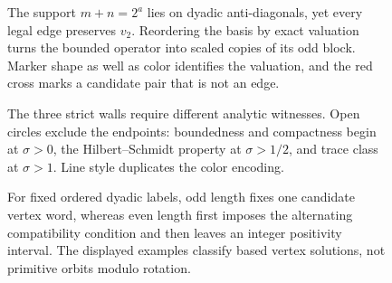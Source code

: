 
\begin{figure}[t]
  \centering
  \resizebox{\textwidth}{!}{}
  \caption{The support $m+n=2^a$ lies on dyadic anti-diagonals, yet every
  legal edge preserves $v_2$.  Reordering the basis by exact valuation turns
  the bounded operator into scaled copies of its odd block.  Marker shape as
  well as color identifies the valuation, and the red cross marks a
  candidate pair that is not an edge.}
  \label{fig:dyadic-blocks}
\end{figure}

\begin{figure}[t]
  \centering
  \resizebox{0.93\textwidth}{!}{}
  \caption{The three strict walls require different analytic witnesses.
  Open circles exclude the endpoints: boundedness and compactness begin at
  $\sigma>0$, the Hilbert--Schmidt property at $\sigma>1/2$, and trace class
  at $\sigma>1$.  Line style duplicates the color encoding.}
  \label{fig:phase-diagram}
\end{figure}

\begin{figure}[t]
  \centering
  \resizebox{0.88\textwidth}{!}{}
  \caption{For fixed ordered dyadic labels, odd length fixes one candidate
  vertex word, whereas even length first imposes the alternating
  compatibility condition and then leaves an integer positivity interval.
  The displayed examples classify based vertex solutions, not primitive
  orbits modulo rotation.}
  \label{fig:cycle-solver}
\end{figure}

\begin{table}[t]
  \centering
  \caption{Exact operator-ideal and determinant domains.  Every endpoint is
  rejected analytically rather than by finite-cutoff extrapolation.}
  \label{tab:phase-domains}
  \small
  
\end{table}

\begin{table}[t]
  \centering
  \caption{Canonical State-A implementation replay.  These finite exact
  comparisons test two independent implementations; they do not prove an
  infinite theorem or a priority claim.}
  \label{tab:canonical-replay}
  \small
  
\end{table}
